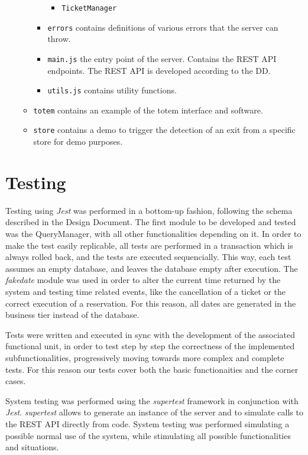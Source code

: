 \documentclass[
]{article}
\begin{document}
\begin{itemize}
\begin{itemize}
\begin{itemize}
\begin{itemize}
        \item \texttt{TicketManager}
      \end{itemize}
      \item \texttt{errors} contains definitions of various errors that the server can throw.
      \item \texttt{main.js} the entry point of the server. Contains the REST API endpoints. The REST API is developed according to the DD.
      \item \texttt{utils.js} contains utility functions.
    \end{itemize}
    \item \texttt{totem} contains an example of the totem interface and software.
    \item \texttt{store} contains a demo to trigger the detection of an exit from a specific store for demo purposes.
  \end{itemize}
\end{itemize}

\hypertarget{testing}{%
\section{Testing}\label{testing}}

Testing using \emph{Jest} was performed in a bottom-up fashion, following the schema described in the Design Document. The first module to be developed and tested was the QueryManager, with all other functionalities depending on it. In order to make the test easily replicable, all tests are performed in a transaction which is always rolled back, and the tests are executed sequencially. This way, each test assumes an empty database, and leaves the database empty after execution. The \emph{fakedate} module was used in order to alter the current time returned by the system and testing time related events, like the cancellation of a ticket or the correct execution of a reservation. For this reason, all dates are generated in the business tier instead of the database.

Tests were written and executed in sync with the development of the associated functional unit, in order to test step by step the correctness of the implemented subfunctionalities, progressively moving towards more complex and complete tests. For this reason our tests cover both the basic functionaities and the corner cases.

System testing was performed using the \emph{supertest} framework in conjunction with \emph{Jest}. \emph{supertest} allows to generate an instance of the server and to simulate calls to the REST API directly from code. System testing was performed simulating a possible normal use of the system, while stimulating all possible functionalities and situations.
\end{document}
